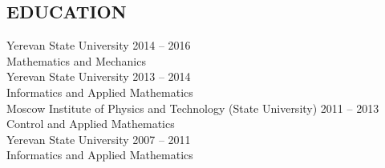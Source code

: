 \documentclass[10pt]{res}
\begin{document}
\begin{resume}


\section{EDUCATION}
\vspace{5pt}
	Yerevan State University \hfill 2014 -- 2016 \yearpostfix \\
	Mathematics and Mechanics \vspace{5pt} \\
	Yerevan State University \hfill 2013 -- 2014 \yearpostfix \\
	Informatics and Applied Mathematics \vspace{5pt} \\
	Moscow Institute of Physics and Technology (State University) \hfill 2011 -- 2013 \yearpostfix \\
	Control and Applied Mathematics \vspace{5pt} \\
	Yerevan State University \hfill 2007 -- 2011 \yearpostfix \\
	Informatics and Applied Mathematics


\end{resume}
\end{document}
